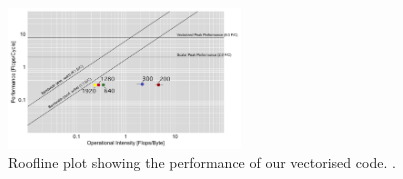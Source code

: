 \begin{figure}\vspace{-6mm}\hspace{-5mm}
  \includegraphics[width=0.55\textwidth]{figures/roofline}
  \caption{Roofline plot showing the performance of our vectorised code. .\label{roofline}}
\end{figure}



